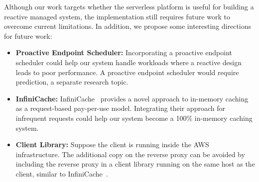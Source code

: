 \newpage
\noindent
Although our work targets whether the serverless platform is useful for building a reactive managed system, the implementation still requires future work to overcome current limitations. In addition, we propose some interesting directions for future work:
\begin{itemize}
    \item \textbf{Proactive Endpoint Scheduler:} Incorporating a proactive endpoint scheduler could help our system handle workloads where a reactive design leads to poor performance. A proactive endpoint scheduler would require prediction, a separate research topic.
    \item \textbf{InfiniCache:} InfiniCache~\cite{wang_infinicache_2020} provides a novel approach to in-memory caching as a request-based pay-per-use model. Integrating their approach for infrequent requests could help our system become a 100\% in-memory caching system.
    \item \textbf{Client Library:} Suppose the client is running inside the AWS infrastructure. The additional copy on the reverse proxy can be avoided by including the reverse proxy in a client library running on the same host as the client, similar to InfiniCache~\cite{wang_infinicache_2020}.
\end{itemize}



